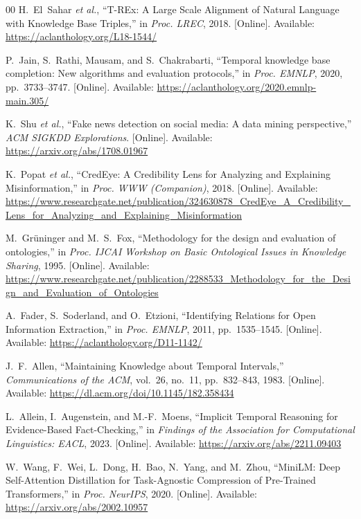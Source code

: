 \documentclass[conference]{IEEEtran}
\begin{document}
\begin{thebibliography}{00}
H.~El~Sahar \textit{et al.},
``T-REx: A Large Scale Alignment of Natural Language with Knowledge Base Triples,''
in \textit{Proc. LREC}, 2018.
[Online]. Available: \url{https://aclanthology.org/L18-1544/}

P.~Jain, S.~Rathi, Mausam, and S.~Chakrabarti,
``Temporal knowledge base completion: New algorithms and evaluation protocols,''
in \textit{Proc. EMNLP}, 2020, pp.~3733--3747.
[Online]. Available: \url{https://aclanthology.org/2020.emnlp-main.305/}

K.~Shu \textit{et al.},
``Fake news detection on social media: A data mining perspective,''
\textit{ACM SIGKDD Explorations}.
[Online]. Available: \url{https://arxiv.org/abs/1708.01967}

K.~Popat \textit{et al.},
``CredEye: A Credibility Lens for Analyzing and Explaining Misinformation,''
in \textit{Proc. WWW (Companion)}, 2018.
[Online]. Available: \url{https://www.researchgate.net/publication/324630878_CredEye_A_Credibility_Lens_for_Analyzing_and_Explaining_Misinformation}

M.~Gr\"{u}ninger and M.~S.~Fox,
``Methodology for the design and evaluation of ontologies,''
in \textit{Proc. IJCAI Workshop on Basic Ontological Issues in Knowledge Sharing}, 1995.
[Online]. Available: \url{https://www.researchgate.net/publication/2288533_Methodology_for_the_Design_and_Evaluation_of_Ontologies}

A.~Fader, S.~Soderland, and O.~Etzioni,
``Identifying Relations for Open Information Extraction,''
in \textit{Proc. EMNLP}, 2011, pp.~1535--1545.
[Online]. Available: \url{https://aclanthology.org/D11-1142/}

J.~F.~Allen,
``Maintaining Knowledge about Temporal Intervals,''
\textit{Communications of the ACM}, vol.~26, no.~11, pp.~832--843, 1983.
[Online]. Available: \url{https://dl.acm.org/doi/10.1145/182.358434}

L.~Allein, I.~Augenstein, and M.-F.~Moens,
``Implicit Temporal Reasoning for Evidence-Based Fact-Checking,''
in \textit{Findings of the Association for Computational Linguistics: EACL}, 2023.
[Online]. Available: \url{https://arxiv.org/abs/2211.09403}

W.~Wang, F.~Wei, L.~Dong, H.~Bao, N.~Yang, and M.~Zhou,
``MiniLM: Deep Self-Attention Distillation for Task-Agnostic Compression of Pre-Trained Transformers,''
in \textit{Proc. NeurIPS}, 2020.
[Online]. Available: \url{https://arxiv.org/abs/2002.10957}


\end{thebibliography}
\end{document}
